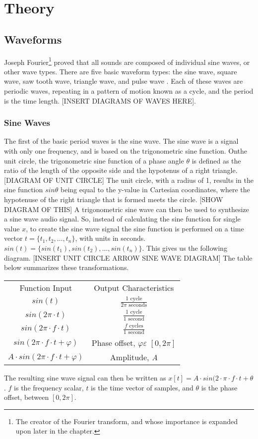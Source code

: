 \chapter[Theory]{Theory}\label{theory}

\section{Waveforms}
Joseph Fourier\footnote{The creator of the Fourier transform, and whose importance is expanded upon later in the chapter.} proved that all sounds are composed of individual sine waves, or other wave types. There are five basic waveform types: the sine wave, square wave, saw tooth wave, triangle wave, and pulse wave \cite{Winer_2018}. Each of these waves are periodic waves, repeating in a pattern of motion known as a cycle, and the period is the time length. [INSERT DIAGRAMS OF WAVES HERE]. 

\subsection{Sine Waves}
The first of the basic period waves is the sine wave. The sine wave is a signal with only one frequency, and is based on the trigonometric sine function. Onthe unit circle, the trigonometric sine function of a phase angle $\theta$ is defined as the ratio of the length of the opposite side and the hypotenus of a right triangle. [DIAGRAM OF UNIT CIRCLE] The unit circle, with a radius of 1, results in the sine function $sin\theta$ being equal to the y-value in Cartesian coordinates, where the hypotenuse of the right triangle that is formed meets the circle. [SHOW DIAGRAM OF THIS] A trigonometric sine wave can then be used to synthesize a sine wave audio signal. So, instead of calculating the sine function for single value $x$, to create the sine wave signal the sine function is performed on a time vector $t = \{t_1, t_2, \dots, t_n\}$, with units in seconds. $sin(t) = \{sin(t_1), sin(t_2), \dots, sin(t_n)\}$. This gives us the following diagram. [INSERT UNIT CIRCLE ARROW SINE WAVE DIAGRAM] The table below summarizes these transformations.
\begin{center}
    \begin{tabular}{c c}
        Function Input & Output Characteristics \\
        $sin(t)$ & $\frac{1 \textrm{ cycle}}{2\pi \textrm{ seconds}}$\\
        $sin(2\pi \cdot t)$ & $\frac{1 \textrm{ cycle}}{1 \textrm{ second}}$\\
        $sin(2\pi \cdot f \cdot t)$ & $\frac{f \textrm{ cycles}}{1 \textrm{ second}}$\\
        $sin(2\pi \cdot f \cdot t + \varphi)$ & Phase offset, $\varphi \varepsilon$ $[0, 2\pi]$\\
        $A \cdot sin(2\pi \cdot f \cdot t + \varphi)$ & Amplitude, \textit{A}
    \end{tabular}
\end{center}
The resulting sine wave signal can then be written as $x[t] = A \cdot sin(2 \cdot \pi \cdot f \cdot t + \theta$. $f$ is the frequency scalar, $t$ is the time vector of samples, and $\theta$ is the phase offset, between $[0, 2\pi]$.

